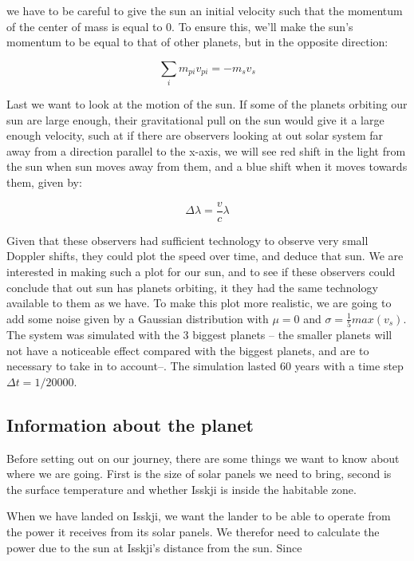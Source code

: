 \documentclass[a4paper, 10pt]{article}
\begin{document}
we have to be careful to give the sun an initial velocity such that the momentum of the center of mass is equal to 0. To ensure this, we'll make the sun's momentum to be equal to that of other planets, but in the opposite direction:

\begin{equation}
\sum\limits_i m_{pi}v_{pi} = -m_sv_s
\end{equation}

Last we want to look at the motion of the sun. If some of the planets orbiting our sun are large enough, their gravitational pull on the sun would give it a large enough velocity, such at if there are observers looking at out solar system far away from a direction parallel to the x-axis, we will see red shift in the light from the sun when sun moves away from them, and a blue shift when it moves towards them, given by:

\begin{equation}
\Delta \lambda = \frac{v}{c}\lambda
\end{equation}

Given that these observers had sufficient technology to observe very small Doppler shifts, they could plot the speed over time, and deduce that sun. We are interested in making such a plot for our sun, and to see if these observers could conclude that out sun has planets orbiting, it they had the same technology available to them as we have. To make this plot more realistic, we are going to add some noise given by a Gaussian distribution with $\mu = 0$ and $\sigma = \frac{1}{5} max(v_s)$.\\

The system was simulated with the 3 biggest planets -- the smaller planets will not have a noticeable effect compared with the biggest planets, and are to necessary to take in to account--. The simulation lasted 60 years with a time step $\Delta t = 1/20000$.

\subsection{Information about the planet}
Before setting out on our journey, there are some things we want to know about where we are going. First is the size of solar panels we need to bring, second is the surface temperature and whether Isskji is inside the habitable zone.

When we have landed on Isskji, we want the lander to be able to operate from the power it receives from its solar panels. We therefor need to calculate the power due to the sun at Isskji's distance from the sun. Since 
\end{document}

